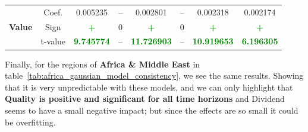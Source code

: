 \documentclass[11pt,english,a4paper,hidelinks]{book}
\begin{document}
\begin{table}[H]
\begin{tabular}{lccccccc}
        \midrule
        \multirow{3}{*}{\textbf{Value}} 
            & Coef. & 0.005235 & -- & 0.002801 & -- & 0.002318 & 0.002174 \\
            & Sign & \textbf{\textcolor{green}{+}} & 0 & \textbf{\textcolor{green}{+}} & 0 & \textbf{\textcolor{green}{+}} & \textbf{\textcolor{green}{+}} \\
            & t-value & \textbf{\textcolor{green}{9.745774}} & -- & \textbf{\textcolor{green}{11.726903}} & -- & \textbf{\textcolor{green}{10.919653}} & \textbf{\textcolor{green}{6.196305}} \\
        \bottomrule
    \end{tabular}
    \label{tab:latam_gaussian_model_consistency}
\end{table}

\noindent Finally, for the regions of \textbf{Africa \& Middle East} in table~\ref{tab:africa_gaussian_model_consistency}, we see the same results. Showing that it is very unpredictable with these models, and we can only highlight that \textbf{Quality is positive and significant for all time horizons} and Dividend seems to have a small negative impact; but since the effects are so small it could be overfitting.
\end{document}
